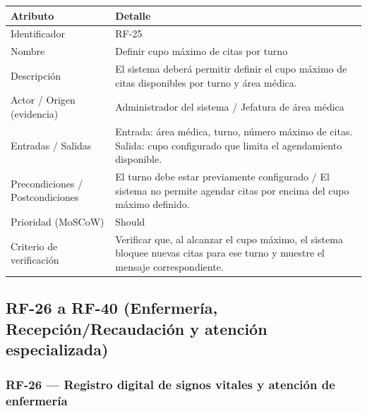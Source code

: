 \documentclass[11pt,a4paper]{article}
\begin{document}
	\begin{longtable}{p{} p{}}
		
		\toprule
		\textbf{Atributo} & \textbf{Detalle} \\
		\midrule
		\endhead
		
		Identificador & RF-25 \\
		Nombre & Definir cupo máximo de citas por turno \\
		Descripción & El sistema deberá permitir definir el cupo máximo de citas disponibles por turno y área médica. \\
		Actor / Origen (evidencia) & Administrador del sistema / Jefatura de área médica \\
		Entradas / Salidas & Entrada: área médica, turno, número máximo de citas. Salida: cupo configurado que limita el agendamiento disponible. \\
		Precondiciones / Postcondiciones & El turno debe estar previamente configurado / El sistema no permite agendar citas por encima del cupo máximo definido. \\
		Prioridad (MoSCoW) & Should \\
		Criterio de verificación & Verificar que, al alcanzar el cupo máximo, el sistema bloquee nuevas citas para ese turno y muestre el mensaje correspondiente. \\
		\bottomrule
	\end{longtable}
	
	\subsection{RF-26 a RF-40 (Enfermería, Recepción/Recaudación y atención especializada)}
	
	\subsubsection{RF-26 --- Registro digital de signos vitales y atención de enfermería}
	
\end{document}
